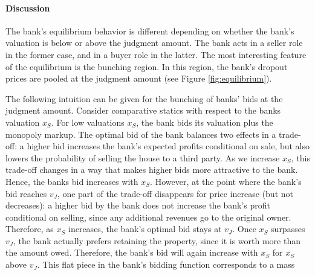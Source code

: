 \documentclass[11pt,twopage]{article}
\begin{document}
\paragraph{Discussion} The bank's equilibrium behavior is different
depending on whether the bank's valuation is below or above the
judgment amount. The bank acts in a seller role in the former case,
and in a buyer role in the latter. The most interesting feature of the
equilibrium is the bunching region. In this region, the bank's dropout
prices are pooled at the judgment amount (see Figure
\ref{fig:equilibrium}).

The following intuition can be given for the bunching of banks' bids
at the judgment amount. Consider comparative statics with respect to
the banks valuation $x_S$. For low valuations $x_S$, the bank bids its
valuation plus the monopoly markup. The optimal bid of the bank
balances two effects in a trade-off: a higher bid increases the bank's
expected profits conditional on sale, but also lowers the
probability of selling the house to a third party. As we increase
$x_S$, this trade-off changes in a way that makes higher bids more
attractive to the bank. Hence, the banks bid increases with
$x_S$. However, at the point where the bank's bid reaches $v_J$, one
part of the trade-off disappears for price increase (but not
decreases): a higher bid by the bank does not increase the bank's
profit conditional on selling, since any additional revenues go to the
original owner. Therefore, as $x_S$ increases, the bank's optimal bid
stays at $v_J$. Once $x_S$ surpasses $v_J$, the bank actually prefers
retaining the property, since it is worth more than the amount
owed. Therefore, the bank's bid will again increase with $x_S$ for
$x_S$ above $v_J$.
%
This flat piece in the bank's bidding function corresponds to a mass
\end{document}
